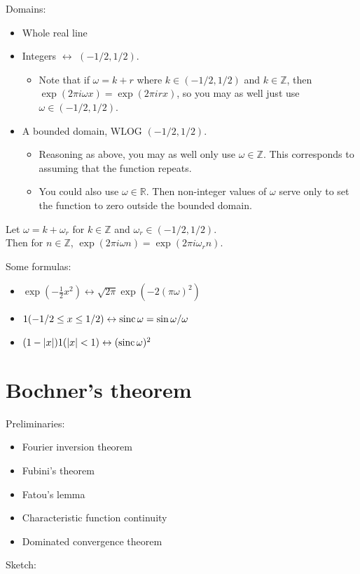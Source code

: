 \documentclass[twoside,11pt]{article}
\numberwithin{equation}{section}
\begin{document}
Domains:
%
\begin{itemize}
    \item Whole real line
    \item Integers $\leftrightarrow$ $(-1/2, 1/2)$.
    \begin{itemize}
        \item Note that if $\omega = k + r$ where $k \in (-1/2, 1/2)$ and $k \in \mathbb{Z}$,
        then $\exp(2 \pi i \omega x) = \exp(2 \pi i r x)$, so you may as well just
        use $\omega \in (-1/2, 1/2)$.
    \end{itemize}
    \item A bounded domain, WLOG $(-1/2, 1/2)$.
    \begin{itemize}
        \item Reasoning as above, you may as well only use $\omega \in \mathbb{Z}$.
        This corresponds to assuming that the function repeats.
        \item You could also use $\omega \in \mathbb{R}$.  Then non-integer
        values of $\omega$ serve only to set the function to zero outside
        the bounded domain.
    \end{itemize}
\end{itemize}
%
Let $\omega = k + \omega_r$ for $k \in \mathbb{Z}$ and $\omega_r \in (-1/2, 1/2)$.\\
Then for $n \in \mathbb{Z}$, $\exp(2\pi i \omega n) = \exp(2\pi i \omega_r n)$.

Some formulas:
%
\begin{itemize}
    \item $\exp\left(-\frac{1}{2} x^2 \right) \leftrightarrow \sqrt{2\pi} \exp\left(-2 (\pi \omega)^2 \right)$
    \item $1(-1/2 \le x \le 1/2) \leftrightarrow \mathrm{sinc}\, \omega = \sin \omega / \omega$
    \item $(1 - |x|) 1(|x| < 1) \leftrightarrow (\mathrm{sinc}\, \omega)^2$
\end{itemize}
%

%



\newpage
\section*{Bochner's theorem}

Preliminaries:
%
\begin{itemize}
    \item Fourier inversion theorem
    \item Fubini's theorem
    \item Fatou's lemma
    \item Characteristic function continuity
    \item Dominated convergence theorem
\end{itemize}
%
Sketch:
\end{document}
